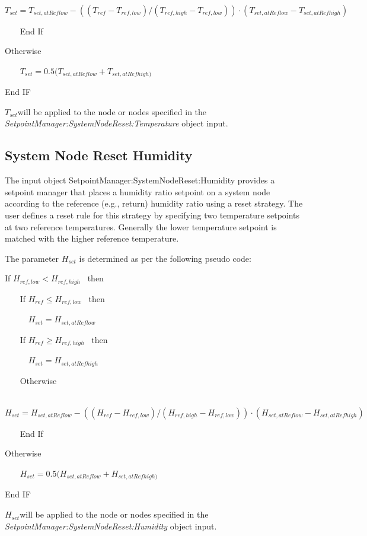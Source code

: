 ~~~~~ \({T_{set}} = {T_{set,atReflow}} - (({T_{ref}} - {T_{ref,low}})/({T_{ref,high}} - {T_{ref,low}}))\cdot ({T_{set,atReflow}} - {T_{set,atRefhigh}})\)

~~~ End If

Otherwise

~~~ \({T_{set}} = 0.5({T_{set,atReflow}} + {T_{set,atRefhigh)}}\)

End IF

\emph{\({T_{set}}\)}will be applied to the node or nodes specified in the \emph{SetpointManager:SystemNodeReset:Temperature} object input.

\subsection{System Node Reset Humidity}\label{system-node-reset-humidity}

The input object SetpointManager:SystemNodeReset:Humidity provides a setpoint manager that places a humidity ratio setpoint on a system node according to the reference (e.g., return) humidity ratio using a reset strategy. The user defines a reset rule for this strategy by specifying two temperature setpoints at two reference temperatures. Generally the lower temperature setpoint is matched with the higher reference temperature.

The parameter \(H_{set}\) is determined as per the following pseudo code:

If \({H_{ref,low}} < {H_{ref,high}}\) ~then

~~~ If \({H_{ref}} \le {H_{ref,low}}\) ~then

~~~~~ \({H_{set}} = {H_{set,atReflow}}\)

~~~ If \({H_{ref}} \ge {H_{ref,high}}\) ~then

~~~~~ \({H_{set}} = {H_{set,atRefhigh}}\)

~~~ Otherwise

~~~~~ \({H_{set}} = {H_{set,atReflow}} - (({H_{ref}} - {H_{ref,low}})/({H_{ref,high}} - {H_{ref,low}}))\cdot ({H_{set,atReflow}} - {H_{set,atRefhigh}})\)

~~~ End If

Otherwise

~~~ \({H_{set}} = 0.5({H_{set,atReflow}} + {H_{set,atRefhigh)}}\)

End IF

\emph{\({H_{set}}\)}will be applied to the node or nodes specified in the \emph{SetpointManager:SystemNodeReset:Humidity} object input.
